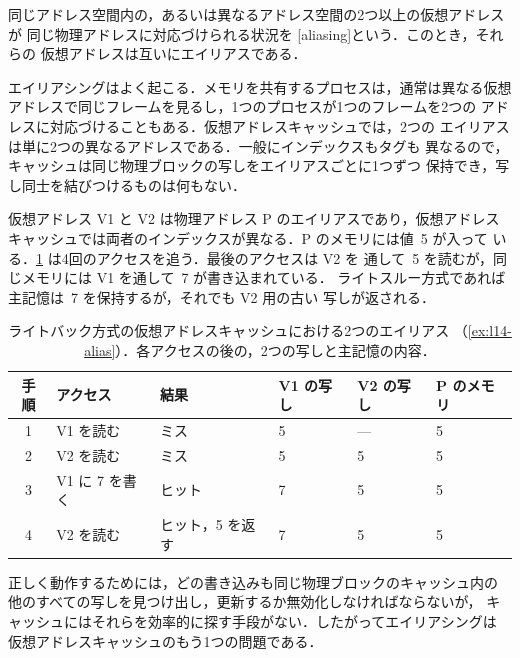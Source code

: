 \documentclass[../main.tex]{subfiles}
\begin{document}
\begin{definition}[エイリアシング]
  同じアドレス空間内の，あるいは異なるアドレス空間の2つ以上の仮想アドレスが
  同じ物理アドレスに対応づけられる状況を
  [aliasing]という．このとき，それらの
  仮想アドレスは互いにエイリアスである．
\end{definition}

エイリアシングはよく起こる．メモリを共有するプロセスは，通常は異なる仮想
アドレスで同じフレームを見るし，1つのプロセスが1つのフレームを2つの
アドレスに対応づけることもある．仮想アドレスキャッシュでは，2つの
エイリアスは単に2つの異なるアドレスである．一般にインデックスもタグも
異なるので，キャッシュは同じ物理ブロックの写しをエイリアスごとに1つずつ
保持でき，写し同士を結びつけるものは何もない．

\begin{example}
  \label{ex:l14-alias}
  仮想アドレス V1 と V2 は物理アドレス P のエイリアスであり，仮想アドレス
  キャッシュでは両者のインデックスが異なる．P のメモリには値~5 が入って
  いる．\cref{tab:l14-alias} は4回のアクセスを追う．最後のアクセスは V2 を
  通して~5 を読むが，同じメモリには V1 を通して~7 が書き込まれている．
  ライトスルー方式であれば主記憶は~7 を保持するが，それでも V2 用の古い
  写しが返される．
\end{example}

\begin{table}[htbp]
  \centering\small
  \caption{ライトバック方式の仮想アドレスキャッシュにおける2つのエイリアス
    （\cref{ex:l14-alias}）．各アクセスの後の，2つの写しと主記憶の内容．}
  \label{tab:l14-alias}
  \begin{tabular}{@{}clllll@{}}
    \toprule
    手順 & アクセス      & 結果            & V1 の写し & V2 の写し & P のメモリ \\
    \midrule
    1    & V1 を読む     & ミス            & 5         & ---       & 5 \\
    2    & V2 を読む     & ミス            & 5         & 5         & 5 \\
    3    & V1 に 7 を書く & ヒット          & 7         & 5         & 5 \\
    4    & V2 を読む     & ヒット，5 を返す & 7         & 5         & 5 \\
    \bottomrule
  \end{tabular}
\end{table}

正しく動作するためには，どの書き込みも同じ物理ブロックのキャッシュ内の
他のすべての写しを見つけ出し，更新するか無効化しなければならないが，
キャッシュにはそれらを効率的に探す手段がない．したがってエイリアシングは
仮想アドレスキャッシュのもう1つの問題である．
\end{document}
